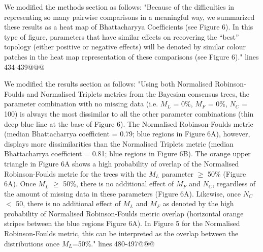 \documentclass[12pt,letterpaper]{article}
\begin{document}
\begin{enumerate}
We modified the methods section as follows:
"Because of the difficulties in representing so many pairwise comparisons in a meaningful way, we summarized these results as a heat map of Bhattacharyya Coefficients (see Figure 6).
In this type of figure, parameters that have similar effects on recovering the ``best'' topology (either positive or negative effects) will be denoted by similar colour patches in the heat map representation of these comparisons (see Figure 6)." lines 434-439@@@

We modified the results section as follows:
"Using both Normalised Robinson-Foulds and Normalised Triplets metrics from the Bayesian consensus trees, the parameter combination with no missing data (i.e. $M_{L}$ = 0\%, $M_{F}$ = 0\%, $N_{C}$ = 100) is always the most dissimilar to all the other parameter combinations (thin deep blue line at the base of Figure 6).
The Normalised Robinson-Foulds metric (median Bhattacharrya coefficient = 0.79; blue regions in Figure 6A), however, displays more dissimilarities than the Normalised Triplets metric (median Bhattacharrya coefficient = 0.81; blue regions in Figure 6B).
The orange upper triangle in Figure 6A shows a high probability of overlap of the Normalised Robinson-Foulds metric for the trees with the $M_{L}$ parameter $\geq$ 50\% (Figure 6A).
Once $M_{L}$ $\geq$ 50\%, there is no additional effect of $M_{F}$ and $N_{C}$, regardless of the amount of missing data in these parameters (Figure 6A).
Likewise, once $N_{C}$ $<$ 50, there is no additional effect of $M_{L}$ and $M_{F}$ as denoted by the high probability of Normalised Robinson-Foulds metric overlap (horizontal orange stripes between the blue regions Figure 6A).
In Figure 5 for the Normalised Robinson-Foulds metric, this can be interpreted as the overlap between the distributions once $M_L$=50\%." lines 480-497@@@


\end{enumerate}
\end{document}
